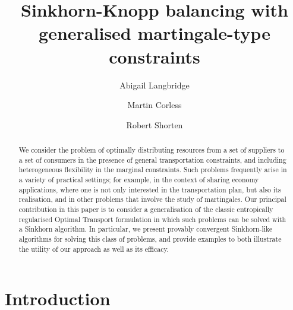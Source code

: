 \documentclass[twocolumn]{article}
\newcommand{\ignore}[1]{}
\begin{document}
\title{Sinkhorn-Knopp balancing with generalised martingale-type constraints}

 

\author[1]{Abigail Langbridge}
\author[2]{Martin Corless}
\author[1]{Robert Shorten}




\maketitle

\begin{abstract}
We consider the problem of optimally distributing resources from a set of suppliers to a set of consumers in the presence of general transportation constraints, and including heterogeneous flexibility in the marginal constraints. Such problems frequently arise in a variety of practical settings; for example, in the context of sharing economy applications, where one is not only interested in the transportation plan, but also its realisation, and in other problems that involve the study of martingales. Our principal contribution in this paper is to consider a generalisation of the classic entropically regularised Optimal Transport formulation in which such problems can be solved with a Sinkhorn algorithm.
In particular, we present provably convergent Sinkhorn-like algorithms for solving this class of problems, and provide examples to both illustrate the utility of our approach as well as its efficacy.
\end{abstract}


\section{Introduction}
\end{document}
